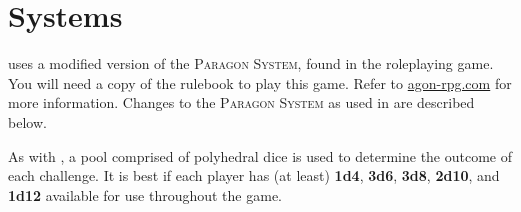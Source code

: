 \documentclass[11pt, a5paper, parskip=half-, DIV=12]{scrartcl}
\begin{document}
\newpage

\ClearShipoutPicture
{}


\section*{Systems}
\ENDEAVOUR{} uses a modified version of the \textsc{Paragon System}, found in the \AGON{} roleplaying game. You will need a copy of the \AGON{} rulebook to play this game. Refer to \href{http://www.agon-rpg.com}{agon-rpg.com} for more information. Changes to the \textsc{Paragon System} as used in \ENDEAVOUR{} are described below.

As with \AGON{}, a pool comprised of polyhedral dice is used to determine the outcome of each challenge. It is best if each player has (at least) \textbf{1d4}, \textbf{3d6}, \textbf{3d8}, \textbf{2d10}, and \textbf{1d12} available for use throughout the game.
\end{document}
